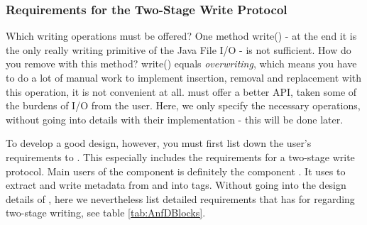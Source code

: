 \subsubsection{Requirements for the Two-Stage Write Protocol }%
\label{sec:AnforderungenandaszweistufigeSchreibprotokoll}%

Which writing operations must be offered? One method write() \-- at the end it is the only really writing primitive of the Java File I/O \-- is not sufficient. How do you remove with this method? write() equals \textit{overwriting}, which means you have to do a lot of manual work to implement insertion, removal and replacement with this operation, it is not convenient at all. \COMPmedia{} must offer a better API, taken some of the burdens of I/O from the user. Here, we only specify the necessary operations, without going into details with their implementation - this will be done later.

To develop a good design, however, you must first list down the user's requirements to \COMPmedia{}. This especially includes the requirements for a two-stage write protocol. Main users of the component is definitely the component \COMPdataPartManagement{}. It uses \COMPmedia{} to extract and write metadata from and into tags. Without going into the design details of \COMPdataPartManagement{}, here we nevertheless list detailed requirements that \COMPdataPartManagement{} has for \COMPmedia{} regarding two-stage writing, see table \hyperref[tab:AnfDBlocks]{\ref{tab:AnfDBlocks}}.

